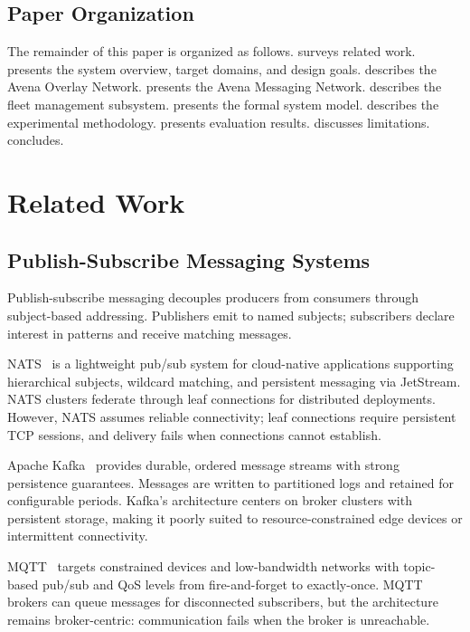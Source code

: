 \documentclass[journal]{IEEEtran}
\begin{document}
\subsection{Paper Organization}

The remainder of this paper is organized as follows.  surveys related work.  presents the system overview, target domains, and design goals.  describes the Avena Overlay Network.  presents the Avena Messaging Network.  describes the fleet management subsystem.  presents the formal system model.  describes the experimental methodology.  presents evaluation results.  discusses limitations.  concludes.


\section{Related Work}
\label{sec:related}

\subsection{Publish-Subscribe Messaging Systems}

Publish-subscribe messaging decouples producers from consumers through subject-based addressing. Publishers emit to named subjects; subscribers declare interest in patterns and receive matching messages.

NATS~\cite{nats} is a lightweight pub/sub system for cloud-native applications supporting hierarchical subjects, wildcard matching, and persistent messaging via JetStream. NATS clusters federate through leaf connections for distributed deployments. However, NATS assumes reliable connectivity; leaf connections require persistent TCP sessions, and delivery fails when connections cannot establish.

Apache Kafka~\cite{kafka} provides durable, ordered message streams with strong persistence guarantees. Messages are written to partitioned logs and retained for configurable periods. Kafka's architecture centers on broker clusters with persistent storage, making it poorly suited to resource-constrained edge devices or intermittent connectivity.

MQTT~\cite{mqtt} targets constrained devices and low-bandwidth networks with topic-based pub/sub and QoS levels from fire-and-forget to exactly-once. MQTT brokers can queue messages for disconnected subscribers, but the architecture remains broker-centric: communication fails when the broker is unreachable.
\end{document}

